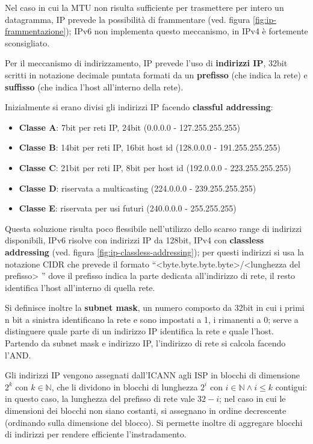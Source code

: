 \documentclass[11pt, italian, openany]{book}
\begin{document}
\begin{sloppypar}
Nel caso in cui la MTU non risulta sufficiente per trasmettere per intero un datagramma, IP prevede la possibilit\`a di frammentare (ved. figura
\ref{fig:ip-frammentazione}); IPv6 non implementa questo meccanismo, in IPv4 \`e fortemente sconsigliato.

Per il meccanismo di indirizzamento, IP prevede l'uso di \textbf{indirizzi IP}, 32bit scritti in notazione decimale puntata formati da un \textbf{prefisso}
(che indica la rete) e \textbf{suffisso} (che indica l'host all'interno della rete).
{}
Inizialmente si erano divisi gli indirizzi IP facendo \textbf{classful addressing}:
\begin{itemize}[itemsep=0pt,topsep=0pt,parsep=0pt]
	\item \textbf{Classe A}: 7bit per reti IP, 24bit (0.0.0.0 - 127.255.255.255)
	\item \textbf{Classe B}: 14bit per reti IP, 16bit host id (128.0.0.0 - 191.255.255.255)
	\item \textbf{Classe C}: 21bit per reti IP, 8bit per host id (192.0.0.0 - 223.255.255.255)
	\item \textbf{Classe D}: riservata a multicasting (224.0.0.0 - 239.255.255.255)
	\item \textbf{Classe E}: riservata per usi futuri (240.0.0.0 - 255.255.255)
\end{itemize}
Questa soluzione risulta poco flessibile nell'utilizzo dello scarso range di indirizzi disponibili, IPv6 risolve con indirizzi IP da 128bit, IPv4 con
\textbf{classless addressing} (ved. figura \ref{fig:ip-classless-addressing}); per questi indirizzi si usa la notazione CIDR che prevede il formato
``\textless{byte.byte.byte.byte}\textgreater{/}\textless{lunghezza del prefisso}\textgreater{ }'' dove il prefisso indica la parte dedicata all'indirizzo di
rete, il resto identifica l'host all'interno di quella rete.

Si definisce inoltre la \textbf{subnet mask}, un numero composto da 32bit in cui i primi n bit a sinistra identificano la rete e sono impostati a 1,
i rimanenti a 0; serve a distinguere quale parte di un indirizzo IP identifica la rete e quale l'host. Partendo da subnet mask e indirizzo IP, l'indirizzo
di rete si calcola facendo l'AND.

Gli indirizzi IP vengono assegnati dall'ICANN agli ISP in blocchi di dimensione \(2^{k}\) con \( k \in \mathbb{N}\), che li dividono in blocchi di lunghezza
\(2^{i}\) con \(i \in \mathbb{N} \wedge i \leq k\) contigui: in questo caso, la lunghezza del prefisso di rete vale \( 32 - i \); nel caso in cui le dimensioni
dei blocchi non siano costanti, si assegnano in ordine decrescente (ordinando sulla dimensione del blocco). Si permette inoltre di aggregare blocchi di
indirizzi per rendere efficiente l'instradamento.


\end{sloppypar}
\end{document}
